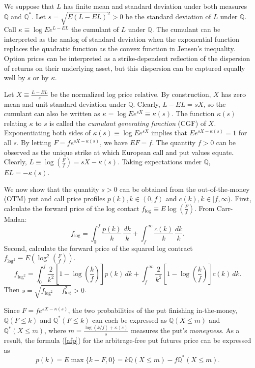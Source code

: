 \documentclass[12pt]{article}
\theoremstyle{definition}
\begin{document}
We suppose that $L$ has finite mean and standard deviation under both
measures \(\mathbb{Q}\) and \(\mathbb{Q}^*\). 
Let $s = \sqrt{E (L - EL)^2} > 0$ be the standard deviation of $L$ under
$\mathbb{Q}$.  Call $\kappa \equiv \log E e^{L - EL}$ the cumulant of $L$
under $\mathbb{Q}$.  The cumulant can be interpreted as the analog of
standard deviation when the exponential function replaces the quadratic
function as the convex function in Jensen's inequality. Option prices
can be interpreted as a strike-dependent reflection of the dispersion of
returns on their underlying asset, but this dispersion can be captured
equally well by $s$ or by $\kappa$.

Let $X \equiv \frac{L - EL}{s}$ be the normalized log price relative. 
By construction, $X$ has zero mean and unit standard deviation under  \(\mathbb{Q}\).
Clearly, $L - E L = sX$, so the cumulant 
can also be written as \(\kappa = \log E e^{sX} \equiv \kappa(s)\).
The function $\kappa(s)$ relating $\kappa$ to $s$ is called 
the {\em cumulant generating function} (CGF) of \(X\). 
Exponentiating both sides of $\kappa(s) \equiv \log E e^{sX}$
implies that \( E e^{sX -\kappa(s)} = 1 \) for all $s$.
By letting \(F = f e^{sX -\kappa(s)} \), we have \(EF = f\).
The quantity $f > 0$ can be observed as the unique strike at which 
European call and put values equate.
Clearly, \( L \equiv \log \left( \frac{F}{f} \right) =  sX -\kappa(s)  \).
Taking expectations under $\mathbb{Q}$, 
$EL = -\kappa(s)$.
 

We now show that the quantity $s>0$ can be obtained from the
out-of-the-money (OTM) put and call price profiles
$p(k), k \in (0,f)$ and $c(k), k \in [f,\infty)$.
First, calculate the forward price of the log contact 
$f_{\log} \equiv E  \log \left( \frac{F}{f} \right)$. From Carr-Madan\cite{CM2001}:
\[
	f_{\log} = \int_0^f \frac{p(k)}{k}\,\frac{dk}{k}
	+ \int_f^{\infty} \frac{c(k)}{k}\,\frac{dk}{k}.
\]
Second, calculate the forward price of the squared log contract 
$f_{\log^2} \equiv E  \left( \log^2 \left( \frac{F}{f} \right) \right)$.
\[
	f_{\log^2} = \int_0^f \frac{2}{k^2}
	  \left[ 1 - \log \left( \frac{k}{f} \right) \right] p(k)\,dk
          + \int_f^{\infty} \frac{2}{k^2}\left[ 1
	  - \log \left( \frac{k}{f} \right) \right] c(k)\,dk.
\]
Then $s = \sqrt{f_{\log^2} - f^2_{\log} } > 0$.

 
Since \(F = f e^{sX -\kappa(s)} \),
the two probabilities of the put finishing in-the-money,
\(\mathbb{Q}(F\le k)\) and \(\mathbb{Q}^*(F\le k)\)
can each be expressed as
$\mathbb{Q} (X\le m)$ and $\mathbb{Q}^* (X\le m)$,
where \(m = \frac{ \log (k/f) + \kappa(s) }{s}\) 
measures the put's {\em moneyness}.
As a result, the formula (\ref{afp}) for the arbitrage-free put futures price can be expressed as
\[
p(k) = E \max\{k - F, 0\} = k \mathbb{Q} (X\le m) - f \mathbb{Q}^* (X \le m).
\]
\end{document}

